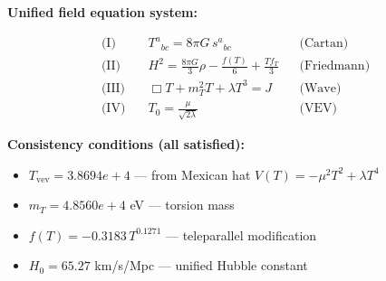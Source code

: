 
\textbf{Unified field equation system:}

\begin{align}
  \text{(I)} \quad & T^a{}_{bc} = 8\pi G \, s^a{}_{bc} && \text{(Cartan)} \\
  \text{(II)} \quad & H^2 = \frac{8\pi G}{3}\rho - \frac{f(T)}{6} + \frac{Tf_T}{3} && \text{(Friedmann)} \\
  \text{(III)} \quad & \Box T + m_T^2 T + \lambda T^3 = J && \text{(Wave)} \\
  \text{(IV)} \quad & T_0 = \frac{\mu}{\sqrt{2\lambda}} && \text{(VEV)}
\end{align}

\textbf{Consistency conditions (all satisfied):}
\begin{itemize}
  \item $T_{\text{vev}} = 3.8694e+4$ — from Mexican hat $V(T) = -\mu^2 T^2 + \lambda T^4$
  \item $m_T = 4.8560e+4$ eV — torsion mass
  \item $f(T) = -0.3183 \, T^{0.1271}$ — teleparallel modification
  \item $H_0 = 65.27$ km/s/Mpc — unified Hubble constant
\end{itemize}
